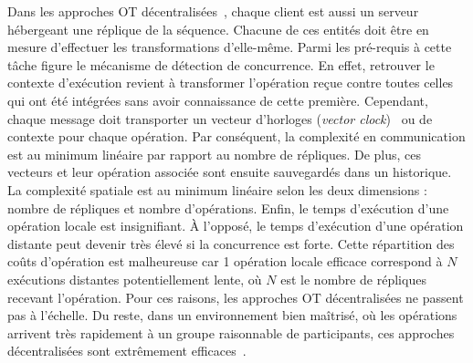 Dans les approches OT décentralisées~\cite{sun2009contextbased}, chaque client
est aussi un serveur hébergeant une réplique de la séquence. Chacune de ces
entités doit être en mesure d'effectuer les transformations d'elle-même. Parmi
les pré-requis à cette tâche figure le mécanisme de détection de concurrence. En
effet, retrouver le contexte d'exécution revient à transformer l'opération reçue
contre toutes celles qui ont été intégrées sans avoir connaissance de cette
première. Cependant, chaque message doit transporter un vecteur d'horloges
(\emph{vector clock})~\cite{lamport1978time} ou de contexte pour chaque
opération. Par conséquent, la complexité en communication est au minimum
linéaire par rapport au nombre de répliques. De plus, ces vecteurs et leur
opération associée sont ensuite sauvegardés dans un historique. La complexité
spatiale est au minimum linéaire selon les deux dimensions : nombre de répliques
et nombre d'opérations. Enfin, le temps d'exécution d'une opération locale est
insignifiant. À l'opposé, le temps d'exécution d'une opération distante peut
devenir très élevé si la concurrence est forte. Cette répartition des coûts
d'opération est malheureuse car 1 opération locale efficace correspond à $N$
exécutions distantes potentiellement lente, où $N$ est le nombre de répliques
recevant l'opération. Pour ces raisons, les approches OT décentralisées ne
passent pas à l'échelle. Du reste, dans un environnement bien maîtrisé, où les
opérations arrivent très rapidement à un groupe raisonnable de participants, ces
approches décentralisées sont extrêmement efficaces~\cite{mehdi2014merging}.




